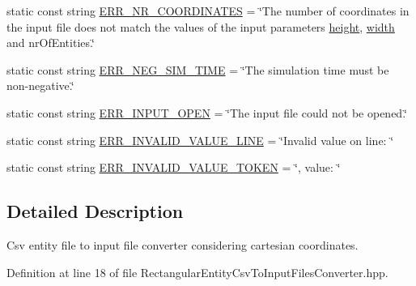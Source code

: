 \begin{DoxyCompactItemize}
\item 
static const string \hyperlink{classmultiscale_1_1video_1_1RectangularEntityCsvToInputFilesConverter_ac290c5c37c0be34a4091f441c4fa67ec}{E\-R\-R\-\_\-\-N\-R\-\_\-\-C\-O\-O\-R\-D\-I\-N\-A\-T\-E\-S} = \char`\"{}The number of coordinates in the input file does not match the values of the input parameters \hyperlink{classmultiscale_1_1video_1_1RectangularEntityCsvToInputFilesConverter_a68cb5dba20157ea4977c1069626cb0ab}{height}, \hyperlink{classmultiscale_1_1video_1_1RectangularEntityCsvToInputFilesConverter_ac4542ad4008e85ab4860146eed6e0200}{width} and nr\-Of\-Entities.\char`\"{}
\item 
static const string \hyperlink{classmultiscale_1_1video_1_1RectangularEntityCsvToInputFilesConverter_a54116309bc8f25763b6b8bd7c6b5963a}{E\-R\-R\-\_\-\-N\-E\-G\-\_\-\-S\-I\-M\-\_\-\-T\-I\-M\-E} = \char`\"{}The simulation time must be non-\/negative.\char`\"{}
\item 
static const string \hyperlink{classmultiscale_1_1video_1_1RectangularEntityCsvToInputFilesConverter_aee92e4b54436bedade20bfb4914fcd09}{E\-R\-R\-\_\-\-I\-N\-P\-U\-T\-\_\-\-O\-P\-E\-N} = \char`\"{}The input file could not be opened.\char`\"{}
\item 
static const string \hyperlink{classmultiscale_1_1video_1_1RectangularEntityCsvToInputFilesConverter_a4041e7ae4c22d07ebcb8f709aeb483d5}{E\-R\-R\-\_\-\-I\-N\-V\-A\-L\-I\-D\-\_\-\-V\-A\-L\-U\-E\-\_\-\-L\-I\-N\-E} = \char`\"{}Invalid value on line\-: \char`\"{}
\item 
static const string \hyperlink{classmultiscale_1_1video_1_1RectangularEntityCsvToInputFilesConverter_aa5359492461a23510f983cd09b876dfb}{E\-R\-R\-\_\-\-I\-N\-V\-A\-L\-I\-D\-\_\-\-V\-A\-L\-U\-E\-\_\-\-T\-O\-K\-E\-N} = \char`\"{}, value\-: \char`\"{}
\end{DoxyCompactItemize}


\subsection{Detailed Description}
Csv entity file to input file converter considering cartesian coordinates. 

Definition at line 18 of file Rectangular\-Entity\-Csv\-To\-Input\-Files\-Converter.\-hpp.



